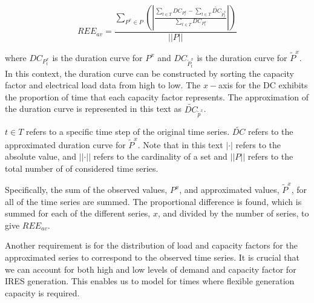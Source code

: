 \begin{equation}
\label{eq:ree_av}
REE_{av}=\frac
{\sum\limits_{P^x{\in} P}\left(\left|
	\frac
	{\sum\limits_{t\in T}DC_{P^x_t}-\sum\limits_{t\in T}\widetilde{DC}_{\widetilde{P}^x_t}}
	{\sum\limits_{t\in T}DC_{P^x_t}}
	\right|\right)
}
{\left|\left|P\right|\right|}
\end{equation}

\noindent where $DC_{P^x_t}$ is the duration curve for $P^x$ and $DC_{\widetilde{P}^x_t}$ is the duration curve for $\widetilde{P}^x$. In this context, the duration curve can be constructed by sorting the capacity factor and electrical load data from high to low. The $x-$axis for the DC exhibits the proportion of time that each capacity factor represents. The approximation of the duration curve is represented in this text as $\widetilde{DC}_{\widetilde{p}^x}$.

$t\in T$ refers to a specific time step of the original time series. $\widetilde{DC}$ refers to the approximated duration curve for $\widetilde{P}^x$. Note that in this text $\left|\cdot\right|$ refers to the absolute value, and $\left|\left|\cdot\right|\right|$ refers to the cardinality of a set and $\left|\left|P\right|\right|$ refers to the total number of of considered time series.

Specifically, the sum of the observed values, $P^x$, and approximated values, $\widetilde P^x$, for all of the time series are summed. The proportional difference is found, which is summed for each of the different series, $x$, and divided by the number of series, to give $REE_{av}$.







Another requirement is for the distribution of load and capacity factors for the approximated series to correspond to the observed time series. It is crucial that we can account for both high and low levels of demand and capacity factor for IRES generation. This enables us to model for times where flexible generation capacity is required.

